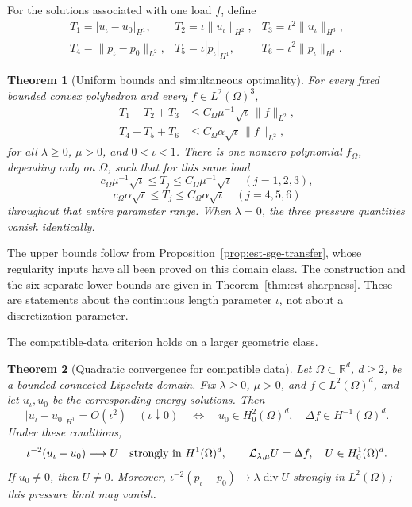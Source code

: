\documentclass[11pt,a4paper]{article}
\newtheorem{theorem}{Theorem}[section]
\theoremstyle{remark}
\numberwithin{equation}{section}
\begin{document}
For the solutions associated with one load \(f\), define
\[
 \begin{array}{lll}
 T_1=|u_\iota-u_0|_{H^1},&
 T_2=\iota\|u_\iota\|_{H^2},&
 T_3=\iota^2\|u_\iota\|_{H^3},\\
 T_4=\|p_\iota-p_0\|_{L^2},&
 T_5=\iota|p_\iota|_{H^1},&
 T_6=\iota^2\|p_\iota\|_{H^2}.
 \end{array}
\]
\begin{theorem}[Uniform bounds and simultaneous optimality]
\label{thm:main-sharp}
For every fixed bounded convex polyhedron and every \(f\in L^2(\Omega)^3\),
\begin{align}
 T_1+T_2+T_3&\le C_\Omega\mu^{-1}\sqrt{\iota}\,\|f\|_{L^2},
 \label{eq:main-u}\\
 T_4+T_5+T_6&\le C_\Omega\alpha\sqrt{\iota}\,\|f\|_{L^2},
 \label{eq:main-p}
\end{align}
for all \(\lambda\ge0\), \(\mu>0\), and \(0<\iota<1\).
There is one nonzero polynomial \(f_\Omega\), depending only on \(\Omega\),
such that for this same load
\[
 c_\Omega\mu^{-1}\sqrt{\iota}\le T_j
       \le C_\Omega\mu^{-1}\sqrt{\iota}\quad(j=1,2,3),
\]
\[
 c_\Omega\alpha\sqrt{\iota}\le T_j
       \le C_\Omega\alpha\sqrt{\iota}\quad(j=4,5,6)
\]
throughout that entire parameter range.
When \(\lambda=0\), the three pressure quantities vanish identically.
\end{theorem}

The upper bounds follow from Proposition~\ref{prop:est-sge-transfer},
whose regularity inputs have all been proved on this domain class.
The construction and the six separate lower bounds are given in
Theorem~\ref{thm:est-sharpness}.
These are statements about the continuous length parameter \(\iota\),
not about a discretization parameter.

The compatible-data criterion holds on a larger geometric class.
\begin{theorem}[Quadratic convergence for compatible data]
\label{thm:main-compatible}
Let \(\Omega\subset\mathbb R^d\), \(d\ge2\), be a bounded connected
Lipschitz domain. Fix \(\lambda\ge0\), \(\mu>0\), and
\(f\in L^2(\Omega)^d\), and let \(u_\iota,u_0\) be the corresponding
energy solutions. Then
\begin{equation}\label{eq:main-compatible}
 |u_\iota-u_0|_{H^1}=O(\iota^2)\quad(\iota\downarrow0)
 \quad\Longleftrightarrow\quad
 u_0\in H^2_0(\Omega)^d,\quad \Delta f\in H^{-1}(\Omega)^d.
\end{equation}
Under these conditions,
\[
 \iota^{-2}(u_\iota-u_0)\longrightarrow U
 \quad\hbox{strongly in }H^1(\Omega)^d,
 \qquad
 \mathcal L_{\lambda,\mu}U=\Delta f,\quad U\in H^1_0(\Omega)^d.
\]
If \(u_0\ne0\), then \(U\ne0\). Moreover,
\(\iota^{-2}(p_\iota-p_0)\to\lambda\operatorname{div}U\) strongly in
\(L^2(\Omega)\); this pressure limit may vanish.
\end{theorem}
\end{document}
